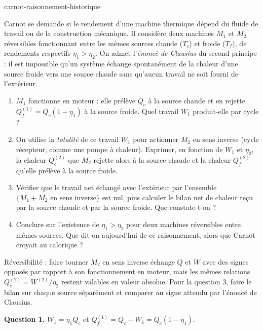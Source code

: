 \begin{exo}{carnot-raisonnement-historique}

Carnot se demande si le rendement d'une machine thermique dépend du fluide de travail ou de la construction mécanique. Il considère deux machines $M_1$ et $M_2$ réversibles fonctionnant entre les mêmes sources chaude ($T_c$) et froide ($T_f$), de rendements respectifs $\eta_1 > \eta_2$. On admet l'\emph{énoncé de Clausius} du second principe : il est impossible qu'un système échange spontanément de la chaleur d'une source froide vers une source chaude sans qu'aucun travail ne soit fourni de l'extérieur.

\begin{enumerate}
\item $M_1$ fonctionne en moteur : elle prélève $Q_c$ à la source chaude et en rejette $Q_f^{(1)} = Q_c(1-\eta_1)$ à la source froide. Quel travail $W_1$ produit-elle par cycle ?
\item On utilise la \emph{totalité} de ce travail $W_1$ pour actionner $M_2$ en sens inverse (cycle récepteur, comme une pompe à chaleur). Exprimer, en fonction de $W_1$ et $\eta_2$, la chaleur $Q_c^{(2)}$ que $M_2$ rejette alors à la source chaude et la chaleur $Q_f^{(2)}$ qu'elle prélève à la source froide.
\item Vérifier que le travail net échangé avec l'extérieur par l'ensemble $\{M_1 + M_2\text{ en sens inverse}\}$ est nul, puis calculer le bilan net de chaleur reçu par la source chaude et par la source froide. Que constate-t-on ?
\item Conclure sur l'existence de $\eta_1 > \eta_2$ pour deux machines réversibles entre mêmes sources. Que dit-on aujourd'hui de ce raisonnement, alors que Carnot croyait au calorique ?
\end{enumerate}

\begin{indication}
Réversibilité : faire tourner $M_2$ en sens inverse échange $Q$ et $W$ avec des signes opposés par rapport à son fonctionnement en moteur, mais les mêmes relations $Q_c^{(2)} = W^{(2)}/\eta_2$ restent valables en valeur absolue. Pour la question 3, faire le bilan sur chaque source séparément et comparer au signe attendu par l'énoncé de Clausius.
\end{indication}

\begin{solution}
\textbf{Question 1.} $W_1 = \eta_1 Q_c$ et $Q_f^{(1)} = Q_c - W_1 = Q_c(1-\eta_1)$.


\end{solution}
\end{exo}
